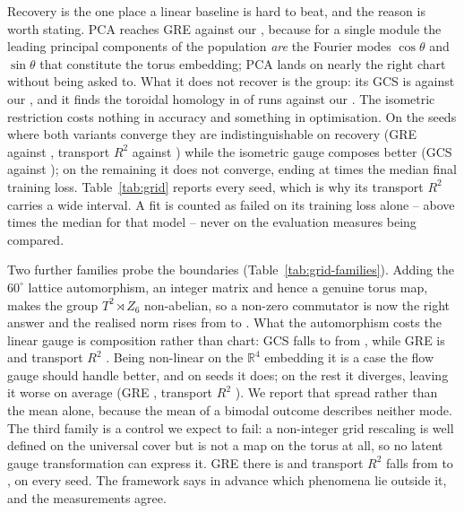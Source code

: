 \documentclass{article}
\theoremstyle{plain}
\newcommand{\R}{\mathbb{R}}
\begin{document}
Recovery is the one place a linear baseline is hard to beat, and the reason is
worth stating. PCA reaches GRE \gridPCAgre{} against our \gridGNDgre, because
for a single module the leading principal components of the population \emph{are}
the Fourier modes $\cos\theta$ and $\sin\theta$ that constitute the torus
embedding; PCA lands on nearly the right chart without being asked to. What it
does not recover is the group: its GCS is \gridPCAgcs{} against our
\gridGNDgcs, and it finds the toroidal homology in \gridPCAbetti{} of runs
against our \gridGNDbetti. The isometric restriction costs nothing in accuracy
and something in optimisation. On the \gridConvergedSeeds{} seeds where both
variants converge they are indistinguishable on recovery (GRE \gridGNDgreConv{}
against \gridGLgreConv, transport $R^2$ \gridGNDtransportConv{} against
\gridGLtransportConv) while the isometric gauge composes better (GCS
\gridGNDgcs{} against \gridGLgcs); on the remaining \gridFailedSeeds{} it does
not converge, ending at \gridLossRatio{} times the median final training loss.
Table~\ref{tab:grid} reports every seed, which is why its transport $R^2$ carries
a wide interval. A fit is counted as failed on its training loss alone -- above
\gridLossTol{} times the median for that model -- never on the evaluation
measures being compared.

Two further families probe the boundaries (Table~\ref{tab:grid-families}). Adding
the $60^\circ$ lattice automorphism, an integer matrix and hence a genuine torus
map, makes the group $T^2 \rtimes Z_6$ non-abelian, so a non-zero commutator is
now the right answer and the realised norm rises from \gridRealisedAbelian{} to
\gridRotRealisedAbelian. What the automorphism costs the linear gauge is
composition rather than chart: GCS falls to \gridRotGcs{} from \gridGNDgcs,
while GRE is \gridRotGre{} and transport $R^2$ \gridRotTransport. Being non-linear
on the $\R^4$ embedding it is a case the flow gauge should handle better, and on
\gridRotFlowBetterSeeds{} seeds it does; on the rest it diverges, leaving it
worse on average (GRE \gridRotFlowGre, transport $R^2$
\gridRotFlowTransport). We report that spread rather than the mean alone,
because the mean of a bimodal outcome describes neither mode. The third family
is a control we expect
to fail: a non-integer grid rescaling \citep{barry2007experience} is well defined
on the universal cover but is not a map on the torus at all, so no latent gauge
transformation can express it. GRE there is \gridCtrlGre{} and transport $R^2$
falls from \gridGNDtransportConv{} to \gridCtrlTransport, on every seed. The
framework says in advance which phenomena lie
outside it, and the measurements agree.
\end{document}
